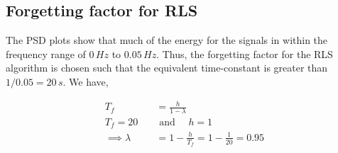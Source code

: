 \subsection{Forgetting factor for RLS}

The PSD plots show that much of the energy for the signals in within the frequency range of $0 \, Hz$ to $0.05 \, Hz$. Thus, the forgetting factor for the RLS algorithm is chosen such that the equivalent time-constant is greater than $1/0.05 = 20 \, s$. We have,

\begin{align*}
        T_f &= \frac{h}{1 - \lambda}\\
        T_f = 20 \quad &\text{ and } \quad h = 1\\
        \implies \lambda &= 1 - \frac{h}{T_f} = 1 - \frac{1}{20} = 0.95
\end{align*}
